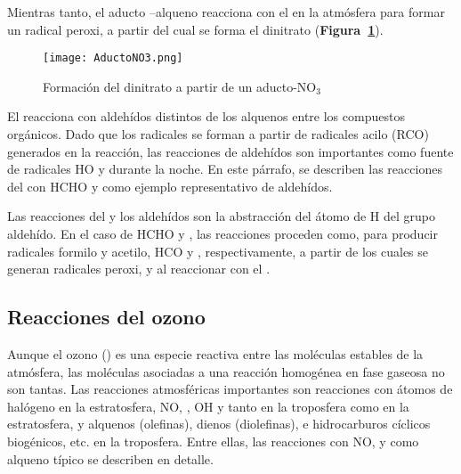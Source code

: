 {\begin{description}
Mientras tanto, el aducto --alqueno reacciona con el  en la atmósfera para formar un radical peroxi, a partir del cual se forma el dinitrato (\textbf{Figura~\ref{aducto}}).
\begin{figure}[htbp]
\begin{center}
\texttt{[image: AductoNO3.png]}
\caption{Formación del dinitrato a partir de un aducto-NO$_3$}
\label{aducto}
\end{center}
\end{figure}

\item[\ce{NO3 + HCHO} ] 
El  reacciona con aldehídos distintos de los alquenos entre los compuestos orgánicos. Dado que los radicales  se forman a partir de radicales acilo (RCO) generados en la reacción, las reacciones de aldehídos  son importantes como fuente de radicales HO y  durante la noche. En este párrafo, se describen las reacciones del  con HCHO y  como ejemplo representativo de aldehídos.

Las reacciones del  y los aldehídos son la abstracción del átomo de H del grupo aldehído. En el caso de HCHO y , las reacciones proceden como,
para producir radicales formilo y acetilo, HCO y , respectivamente, a partir de los cuales se generan radicales peroxi,  y  al reaccionar  con el .
\end{description}

\subsection{Reacciones del ozono}
Aunque el ozono () es una especie reactiva entre las moléculas estables de la atmósfera, las moléculas asociadas a una reacción homogénea en fase gaseosa no son tantas. Las reacciones atmosféricas importantes son reacciones con átomos de halógeno en la estratosfera, NO, , OH y  tanto en la troposfera como en la estratosfera, y alquenos (olefinas), dienos (diolefinas), e hidrocarburos cíclicos biogénicos, etc. en la troposfera. Entre ellas, las reacciones con NO,  y  como alqueno típico se describen en detalle.

}
